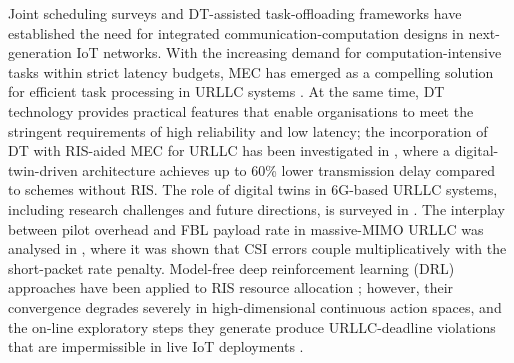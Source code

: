 \documentclass[journal]{IEEEtran}
\begin{document}
Joint scheduling surveys \cite{durisi2016toward} and DT-assisted
task-offloading frameworks \cite{popovski2018slicing} have established
the need for integrated communication-computation designs in
next-generation IoT networks. With the increasing demand for
computation-intensive tasks within strict latency budgets, MEC has
emerged as a compelling solution for efficient task processing in
URLLC systems \cite{mao2017survey}. At the same time, DT technology provides
practical features that enable organisations to meet the stringent
requirements of high reliability and low latency; the incorporation
of DT with RIS-aided MEC for URLLC has been investigated in
\cite{kurma2024ris}, where a digital-twin-driven architecture
achieves up to 60\% lower transmission delay compared to schemes
without RIS. The role of digital twins in 6G-based URLLC systems,
including research challenges and future directions, is surveyed in
\cite{masaracchia2025dt}. The interplay between pilot overhead and
FBL payload rate in massive-MIMO URLLC was analysed in
\cite{ren2020joint}, where it was shown that CSI errors couple
multiplicatively with the short-packet rate penalty. Model-free deep
reinforcement learning (DRL) approaches have been applied to RIS
resource allocation \cite{huang2020reconfigurable,lillicrap2016continuous};
however, their convergence degrades severely in high-dimensional
continuous action spaces, and the on-line exploratory steps they
generate produce URLLC-deadline violations that are impermissible in
live IoT deployments \cite{zappone2019model}.
\end{document}
